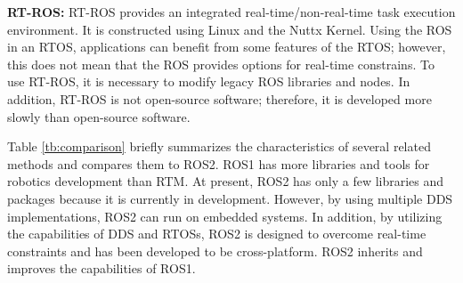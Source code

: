 \documentclass{sig-alternate-05-2015}
\begin{document}
\textbf{RT-ROS:} 
RT-ROS \cite{wei2015rt} provides an integrated real-time/non-real-time task execution environment. 
It is constructed using Linux and the Nuttx Kernel. 
Using the ROS in an RTOS, applications can benefit from some features of the RTOS; however, this does not mean that the ROS provides options for real-time constrains. 
To use RT-ROS, it is necessary to modify legacy ROS libraries and nodes. 
In addition, RT-ROS is not open-source software; therefore, it is developed more slowly than open-source software.

Table \ref{tb:comparison} briefly summarizes the characteristics of several related methods and compares them to ROS2. 
ROS1 has more libraries and tools for robotics development than RTM.
At present, ROS2 has only a few libraries and packages because it is currently in development. 
However, by using multiple DDS implementations, ROS2 can run on embedded systems. 
In addition, by utilizing the capabilities of DDS and RTOSs, ROS2 is designed to overcome real-time constraints and has been developed to be cross-platform.
ROS2 inherits and improves the capabilities of ROS1.
\end{document}
